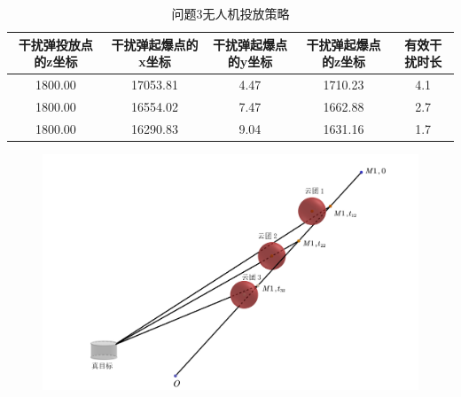 \documentclass[../main.tex]{subfiles}
\begin{document}
\begin{table}[H]
\caption{问题3无人机投放策略}
\label{tab:031} 
\centering
\begin{small}
\begin{tabular}{ccccc}
\toprule[1.5pt]
    干扰弹投放点的z坐标 &干扰弹起爆点的x坐标&干扰弹起爆点的y坐标&干扰弹起爆点的z坐标&有效干扰时长\\
\midrule[1pt]
1800.00             &17053.81                   & 4.47    &1710.23        & 4.1  \\               
1800.00             &16554.02                   & 7.47    & 1662.88       & 2.7  \\               
1800.00             &16290.83                   & 9.04    & 1631.16       & 1.7  \\                
\bottomrule[1.5pt]
\end{tabular}
\end{small}
\end{table}

\begin{figure}[H]
\centering
\includegraphics[scale=0.5]{图二.png}
\caption{}
\label{图2}
\end{figure}
\end{document}
